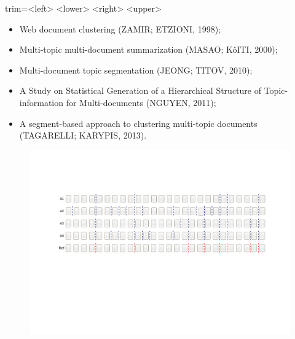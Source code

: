 



trim={<left> <lower> <right> <upper>}
























		\begin{itemize}
			\item Web document clustering (ZAMIR; ETZIONI, 1998); 
			\item Multi-topic multi-document summarization  (MASAO; KôITI, 2000); 
			\item Multi-document topic segmentation (JEONG; TITOV, 2010); 
			\item A Study on Statistical Generation of a Hierarchical Structure of Topic-information for Multi-documents (NGUYEN, 2011); 
			\item A segment-based approach to clustering multi-topic documents (TAGARELLI; KARYPIS, 2013).

		\end{itemize}








  \begin{center}
	\begin{figure}[h!]

	\includegraphics[trim={ 95 255 75 140 },clip,page=1,width=\textwidth]{images/segmentacao-referencia.pdf}

	\end{figure}
\end{center}












